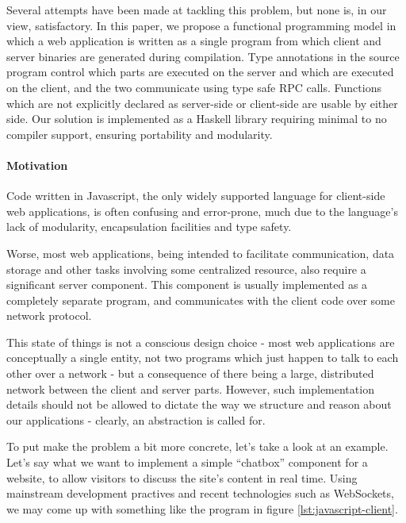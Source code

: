 \documentclass[preprint]{sigplanconf}
\begin{document}
Several attempts have been made at tackling this problem, but none is, in our
view, satisfactory. In this paper, we propose a functional programming model in
which a web application is written as a single program from which client and
server binaries are generated during compilation. Type annotations in the source
program control which parts are executed on the server and which are executed
on the client, and the two communicate using type safe RPC calls. Functions
which are not explicitly declared as server-side or client-side are usable by
either side. Our solution is implemented as a Haskell library requiring minimal
to no compiler support, ensuring portability and modularity.

\paragraph{Motivation}

Code written in Javascript, the only widely supported language for client-side
web applications, is often confusing and error-prone, much due to the
language's lack of modularity, encapsulation facilities and type safety.

Worse, most web applications, being intended to facilitate communication, data
storage and other tasks involving some centralized resource, also require a
significant server component. This component is usually implemented as a
completely separate program, and communicates with the client code over some
network protocol.

This state of things is not a conscious design choice - most web applications
are conceptually a single entity, not two programs which just happen to talk
to each other over a network - but a consequence of there being a large,
distributed network between the client and server parts.
However, such implementation details should not be allowed to dictate the way
we structure and reason about our applications - clearly, an abstraction is
called for.

To put make the problem a bit more concrete, let's take a look at an example.
Let's say what we want to implement a simple ``chatbox'' component for a
website, to allow visitors to discuss the site's content in real time. Using
mainstream development practives and recent technologies such as WebSockets,
we may come up with something like the program in figure
\ref{lst:javascript-client}.
\end{document}
